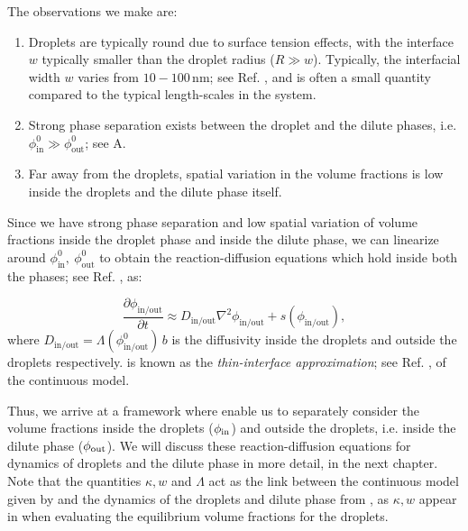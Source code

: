 The observations we make are:
\begin{enumerate}
    \item Droplets are typically round due to surface tension effects, with the interface $w$ typically smaller than the droplet radius ($R \gg w$).
    Typically, the interfacial width $w$ varies from $10-100\,\mathrm{nm}$; see Ref. \cite{safran_2003}, and is often a small quantity compared to the typical length-scales in the system. 
    
    \item Strong phase separation exists between the droplet and the dilute phases, i.e. $\phi^{0}_\mathrm{in} \gg \phi^{0}_\mathrm{out}$; see A.

    \item Far away from the droplets, spatial variation in the volume fractions is low inside the droplets and the dilute phase itself.

\end{enumerate}
Since we have strong phase separation and low spatial variation of volume fractions inside the droplet phase and inside the dilute phase, we can linearize  around $\phi^{0}_\mathrm{in},~\phi^{0}_\mathrm{out}$ to obtain the reaction-diffusion equations which hold inside both the phases; see Ref. \cite{Review2019}, as:

\begin{equation}
\label{eqn:thin_interface_model}
   \frac{\partial \phi_\mathrm{in/out}}{\partial t}
    \approx D_\mathrm{in/out} \nabla^2 \phi_\mathrm{in/out} +
    s(\phi_\mathrm{in/out}),
\end{equation}
where $D_\mathrm{in/out} = \Lambda(\phi^0_\mathrm{in/out})\,b$ is the diffusivity inside the droplets and outside the droplets respectively.
 is known as the \textit{thin-interface approximation}; see Ref. \cite{Zwicker2015}, of the continuous model.

Thus, we arrive at a framework where  enable us to separately consider the volume fractions inside the droplets ($\phi_\mathrm{in}$) and outside the droplets, i.e. inside the dilute phase ($\phi_\mathrm{out}$).
We will discuss these reaction-diffusion equations for dynamics of droplets and the dilute phase in more detail, in the next chapter.
Note that the quantities $\kappa, w$ and $\Lambda$ act as the link between the continuous model given by  and the dynamics of the droplets and dilute phase from , as $\kappa, w$ appear in  when evaluating the equilibrium volume fractions for the droplets.

